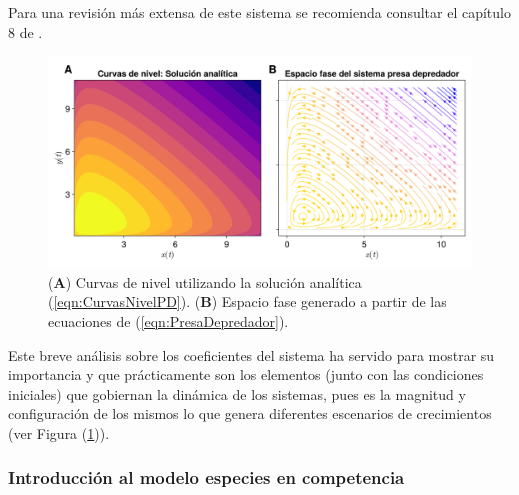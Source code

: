 Para una revisión más extensa de este sistema se recomienda consultar el capítulo 8 de \cite{hirsch2013differential}. 
\begin{figure}[h!]
	\centering
	\includegraphics[scale=0.23]{../Imagenes/Curvas de nivel PD}
	\caption{(\textbf{A}) Curvas de nivel utilizando la solución analítica (\ref{eqn:CurvasNivelPD}). (\textbf{B}) Espacio fase generado a partir de las ecuaciones de (\ref{eqn:PresaDepredador}).}
	\label{fig:CurvasNivelPD}
\end{figure}
\newpage
Este breve análisis sobre los coeficientes del sistema ha servido para mostrar su importancia y que prácticamente son los elementos (junto con las condiciones iniciales) que gobiernan la dinámica de los sistemas, pues es la magnitud y configuración de los mismos lo que genera diferentes escenarios de crecimientos (ver Figura (\ref{fig:CurvasNivelPD})).

\subsubsection*{Introducción al modelo especies en competencia}

